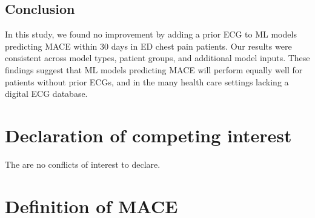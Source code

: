\documentclass[preprint]{elsarticle}
\begin{document}
\subsection{Conclusion}
In this study, we found no improvement by adding a prior ECG to ML models predicting MACE within 30 days in ED chest pain patients. Our results were consistent across model types, patient groups, and additional model inputs. These findings suggest that ML models predicting MACE will perform equally well for patients without prior ECGs, and in the many health care settings lacking a digital ECG database.

\section*{Declaration of competing interest}
The are no conflicts of interest to declare.








\appendix
\section{Definition of MACE}
\label{sec:appendix:mace}
\end{document}

